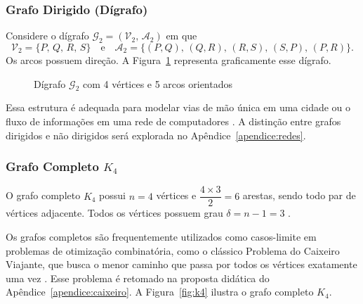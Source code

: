 \documentclass[
  12pt,
  oneside,
  a4paper,
  english,
  brazilian
  ]{abntex2}
\theoremstyle{definition}
\def\sffamily{}%
\def\bfseries{}%
\begin{document}
\subsubsection{Grafo Dirigido (Dígrafo)}

\label{ex:digrafo}
Considere o dígrafo $\mathcal{G}_2 = (\mathcal{V}_2,\, \mathcal{A}_2)$ em que
\[
  \mathcal{V}_2 = \{P,\, Q,\, R,\, S\}
  \quad \text{e} \quad
  \mathcal{A}_2 = \{(P,Q),\, (Q,R),\, (R,S),\, (S,P),\, (P,R)\}.
\]
Os arcos possuem direção. A Figura~\ref{fig:digrafo_ex2}
representa graficamente esse dígrafo.

\begin{figure}[htb]
  \centering
  \caption{Dígrafo $\mathcal{G}_2$ com 4 vértices e 5 arcos orientados}
  \label{fig:digrafo_ex2}
\end{figure}

Essa estrutura é adequada para modelar vias de mão única em uma cidade ou o
fluxo de informações em uma rede de computadores \cite{cormen2009}. A distinção
entre grafos dirigidos e não dirigidos será explorada no Apêndice~\ref{apendice:redes}.

\subsubsection{Grafo Completo $K_4$}

\label{ex:k4}
O grafo completo $K_4$ possui $n = 4$ vértices e
$\dfrac{4 \times 3}{2} = 6$ arestas, sendo todo par de vértices adjacente.
Todos os vértices possuem grau $\delta = n - 1 = 3$ \cite{bondy1976}.

Os grafos completos são frequentemente utilizados como casos-limite em problemas
de otimização combinatória, como o clássico Problema do Caixeiro Viajante, que
busca o menor caminho que passa por todos os vértices exatamente uma vez
\cite{rosen2012}. Esse problema é retomado na proposta didática do Apêndice~\ref{apendice:caixeiro}.
A Figura~\ref{fig:k4} ilustra o grafo completo $K_4$.
\end{document}
